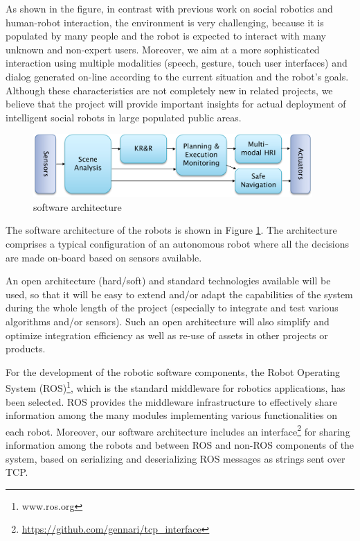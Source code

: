 As shown in the figure, in contrast with previous work on social robotics and human-robot interaction, the {\coaches} environment is very challenging, because it is populated by many people and the robot is expected to interact with many unknown and non-expert users.
Moreover, we aim at a more sophisticated interaction using multiple modalities (speech, gesture, touch user interfaces) and dialog generated on-line according to the current situation
and the robot's goals.
Although these characteristics are not completely new in related projects, we believe that the 
{\coaches} 
project  will provide important insights for actual deployment of intelligent social robots in large populated public areas. 



\begin{figure}[t!]
\centering
\includegraphics[width=0.95\textwidth]{fig/COACHES_swarch_simple.png}
\caption{{\coaches} software architecture}
\label{fig:swarch}
\end{figure}

The software architecture of the {\coaches} robots is shown in Figure \ref{fig:swarch}. The architecture comprises a typical configuration of an autonomous robot  where all the decisions are made on-board based on sensors available.

An open architecture (hard/soft) and standard technologies available will be used, 
so that it will be easy to extend and/or adapt the capabilities of the system during the whole length of the  project  (especially  to  integrate  and  test  various  algorithms  and/or  sensors). Such an open architecture will also simplify and optimize integration efficiency as well as re-use of assets in other projects or products. 

For the development of the robotic software components, the Robot Operating System (ROS)\footnote{www.ros.org}, which is the standard middleware for robotics applications, has been selected.
ROS provides the middleware infrastructure to effectively share information among the many modules implementing various functionalities on each robot. Moreover, our software architecture includes an interface\footnote{\url{https://github.com/gennari/tcp\_interface}} for sharing information among the robots and between ROS and non-ROS components of the system, based on serializing and deserializing ROS messages as strings sent over TCP.

